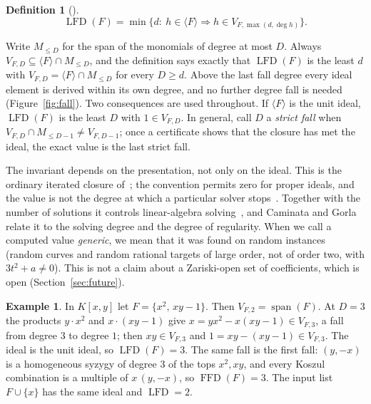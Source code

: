 \documentclass[11pt]{article}
\theoremstyle{definition}\newtheorem{definition}[theorem]{Definition}
\newtheorem{example}[theorem]{Example}
\theoremstyle{remark}\newtheorem{remark}[theorem]{Remark}
\newcommand{\lfd}{\operatorname{LFD}}
\newcommand{\ffd}{\operatorname{FFD}}
\newcommand{\Id}{\langle F\rangle}
\begin{document}
\begin{definition}[\cite{hkyy}]\label{def:lfd}
\[
 \lfd(F)=\min\{d:\ h\in\Id\Longrightarrow h\in V_{F,\max(d,\deg h)}\}.
\]
\end{definition}

Write $M_{\le D}$ for the span of the monomials of degree at most $D$.
Always $V_{F,D}\subseteq\Id\cap M_{\le D}$, and the definition says exactly
that $\lfd(F)$ is the least $d$ with $V_{F,D}=\Id\cap M_{\le D}$ for every
$D\ge d$. Above the last fall degree every ideal element is derived within
its own degree, and no further degree fall is needed
(Figure~\ref{fig:fall}). Two consequences are used throughout. If $\Id$ is
the unit ideal, $\lfd(F)$ is the least $D$ with $1\in V_{F,D}$. In general,
call $D$ a \emph{strict fall} when $V_{F,D}\cap M_{\le D-1}\ne V_{F,D-1}$;
once a certificate shows that the closure has met the ideal, the exact
value is the last strict fall.

The invariant depends on the presentation, not only on the ideal. This is
the ordinary iterated closure of~\cite{hkyy}; the convention permits zero
for proper ideals, and the value is not the degree at which a particular
solver stops~\cite{cg}. Together with the number of solutions it controls
linear-algebra solving~\cite[Prop.~2.8]{hkyy}, and Caminata and
Gorla~\cite{cg} relate it to the solving degree and the degree of
regularity. When we call a computed value \emph{generic}, we mean that it
was found on random instances (random curves and random rational targets of
large order, not of order two, with $3t^2+a\ne0$). This is not a claim about
a Zariski-open set of coefficients, which is open (Section~\ref{sec:future}).

\begin{example}\label{ex:lfd}
In $K[x,y]$ let $F=\{x^2,\,xy-1\}$. Then $V_{F,2}=\operatorname{span}(F)$.
At $D=3$ the products $y\cdot x^2$ and $x\cdot(xy-1)$ give
$x=yx^2-x(xy-1)\in V_{F,3}$, a fall from degree $3$ to degree $1$; then
$xy\in V_{F,3}$ and $1=xy-(xy-1)\in V_{F,3}$. The ideal is the unit ideal,
so $\lfd(F)=3$. The same fall is the first fall: $(y,-x)$ is a homogeneous
syzygy of degree $3$ of the tops $x^2,xy$, and every Koszul combination is
a multiple of $x\,(y,-x)$, so $\ffd(F)=3$. The input list $F\cup\{x\}$ has
the same ideal and $\lfd=2$.
\end{example}
\end{document}
